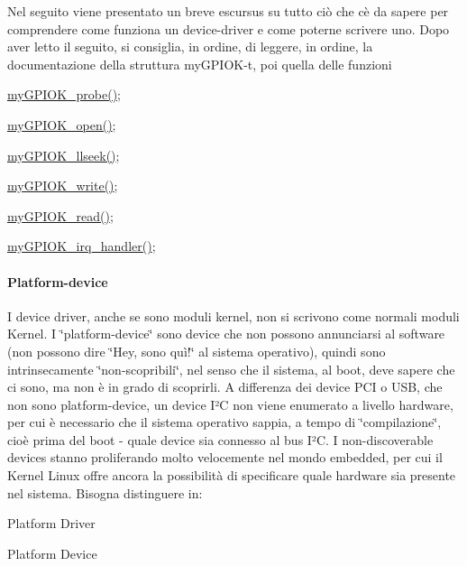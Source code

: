 Nel seguito viene presentato un breve escursus su tutto ciò che c\textquotesingle{}è da sapere per comprendere come funziona un device-\/driver e come poterne scrivere uno. Dopo aver letto il seguito, si consiglia, in ordine, di leggere, in ordine, la documentazione della struttura my\+G\+P\+I\+O\+K-\/t, poi quella delle funzioni
\begin{DoxyItemize}
\item \hyperlink{group___linux-_driver_gae40973a06d72f7c41a9af07513a62307}{my\+G\+P\+I\+O\+K\+\_\+probe()};
\item \hyperlink{group___linux-_driver_gad013759c18fbf6ea96005b9b3bfa5b4e}{my\+G\+P\+I\+O\+K\+\_\+open()};
\item \hyperlink{group___linux-_driver_ga66e7f726b72320a272b633ecbaecefff}{my\+G\+P\+I\+O\+K\+\_\+llseek()};
\item \hyperlink{group___linux-_driver_ga1eea0f6c86e8966ba9b701da57502aad}{my\+G\+P\+I\+O\+K\+\_\+write()};
\item \hyperlink{group___linux-_driver_ga90ac339df9c02ae5f11a2a7727adc923}{my\+G\+P\+I\+O\+K\+\_\+read()};
\item \hyperlink{group___linux-_driver_ga2fc230a12a97aa63e43b2dc4aec73511}{my\+G\+P\+I\+O\+K\+\_\+irq\+\_\+handler()};
\end{DoxyItemize}

\paragraph*{Platform-\/device}

I device driver, anche se sono moduli kernel, non si scrivono come normali moduli Kernel. I \char`\"{}platform-\/device\char`\"{} sono device che non possono annunciarsi al software (non possono dire \char`\"{}\+Hey,
sono quì!\char`\"{} al sistema operativo), quindi sono intrinsecamente \char`\"{}non-\/scopribili\char`\"{}, nel senso che il sistema, al boot, deve sapere che ci sono, ma non è in grado di scoprirli. A differenza dei device P\+CI o U\+SB, che non sono platform-\/device, un device I²C non viene enumerato a livello hardware, per cui è necessario che il sistema operativo sappia, a tempo di \char`\"{}compilazione\char`\"{}, cioè prima del boot -\/ quale device sia connesso al bus I²C. I non-\/discoverable devices stanno proliferando molto velocemente nel mondo embedded, per cui il Kernel Linux offre ancora la possibilità di specificare quale hardware sia presente nel sistema. Bisogna distinguere in\+:
\begin{DoxyItemize}
\item Platform Driver
\item Platform Device
\end{DoxyItemize}

